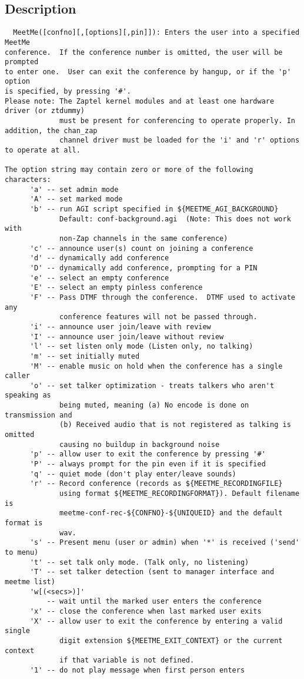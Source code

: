 \subsection{Description}
\begin{verbatim}
  MeetMe([confno][,[options][,pin]]): Enters the user into a specified MeetMe
conference.  If the conference number is omitted, the user will be prompted
to enter one.  User can exit the conference by hangup, or if the 'p' option
is specified, by pressing '#'.
Please note: The Zaptel kernel modules and at least one hardware driver (or ztdummy)
             must be present for conferencing to operate properly. In addition, the chan_zap
             channel driver must be loaded for the 'i' and 'r' options to operate at all.

The option string may contain zero or more of the following characters:
      'a' -- set admin mode
      'A' -- set marked mode
      'b' -- run AGI script specified in ${MEETME_AGI_BACKGROUND}
             Default: conf-background.agi  (Note: This does not work with
             non-Zap channels in the same conference)
      'c' -- announce user(s) count on joining a conference
      'd' -- dynamically add conference
      'D' -- dynamically add conference, prompting for a PIN
      'e' -- select an empty conference
      'E' -- select an empty pinless conference
      'F' -- Pass DTMF through the conference.  DTMF used to activate any
             conference features will not be passed through.
      'i' -- announce user join/leave with review
      'I' -- announce user join/leave without review
      'l' -- set listen only mode (Listen only, no talking)
      'm' -- set initially muted
      'M' -- enable music on hold when the conference has a single caller
      'o' -- set talker optimization - treats talkers who aren't speaking as
             being muted, meaning (a) No encode is done on transmission and
             (b) Received audio that is not registered as talking is omitted
             causing no buildup in background noise
      'p' -- allow user to exit the conference by pressing '#'
      'P' -- always prompt for the pin even if it is specified
      'q' -- quiet mode (don't play enter/leave sounds)
      'r' -- Record conference (records as ${MEETME_RECORDINGFILE}
             using format ${MEETME_RECORDINGFORMAT}). Default filename is
             meetme-conf-rec-${CONFNO}-${UNIQUEID} and the default format is
             wav.
      's' -- Present menu (user or admin) when '*' is received ('send' to menu)
      't' -- set talk only mode. (Talk only, no listening)
      'T' -- set talker detection (sent to manager interface and meetme list)
      'w[(<secs>)]'
          -- wait until the marked user enters the conference
      'x' -- close the conference when last marked user exits
      'X' -- allow user to exit the conference by entering a valid single
             digit extension ${MEETME_EXIT_CONTEXT} or the current context
             if that variable is not defined.
      '1' -- do not play message when first person enters

\end{verbatim}


